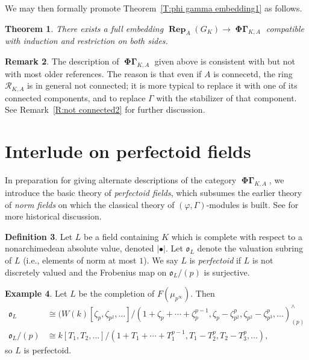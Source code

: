 \documentclass[12pt]{amsart}
\newtheorem{theorem}{Theorem}[section]
\theoremstyle{definition}
\newtheorem{defn}[theorem]{Definition}
\newtheorem{example}[theorem]{Example}
\newtheorem{remark}[theorem]{Remark}
\numberwithin{equation}{theorem}
\newcommand{\calR}{\mathcal{R}}
\newcommand{\frako}{\mathfrak{o}}
\DeclareMathOperator{\PhiGamma}{\mathbf{\Phi \Gamma}}
\DeclareMathOperator{\Rep}{\mathbf{Rep}}
\begin{document}
We may then formally promote Theorem~\ref{T:phi gamma embedding1} as follows.
\begin{theorem} \label{T:phi gamma embedding}
There exists a full embedding $\Rep_A(G_K) \to \PhiGamma_{K,A}$ compatible with induction and restriction on both sides.
\end{theorem}

\begin{remark} \label{R:not connected}
The description of $\PhiGamma_{K,A}$ given above is consistent with \cite{kedlaya-new-phigamma} but not with most older references. The reason is that even if $A$ is connecetd, the ring $\calR_{K,A}$ is in general not connected; it is more typical to replace it with one of its connected components, and to replace $\Gamma$ with the stabilizer of that component.
See Remark~\ref{R:not connected2} for further discussion.
\end{remark}

\section{Interlude on perfectoid fields}
\label{sec:perfectoid}

In preparation for giving alternate descriptions of the category $\PhiGamma_{K,A}$, we introduce the basic theory of \emph{perfectoid fields}, which subsumes the earlier theory of \emph{norm fields} on which the classical theory of $(\varphi, \Gamma)$-modules is built. See \cite{kedlaya-new-phigamma} for more historical discussion.

\begin{defn}
Let $L$ be a field containing $K$ which is complete with respect to a nonarchimedean absolute value, denoted $\left| \bullet \right|$. Let $\frako_L$ denote the valuation subring of $L$ (i.e., elements of norm at most $1$). We say $L$ is \emph{perfectoid} if $L$ is not discretely valued and the Frobenius map on $\frako_L/(p)$ is surjective.
\end{defn}

\begin{example}  \label{exa:cyclotomic}
Let $L$ be the completion of $F(\mu_{p^\infty})$.
Then 
\begin{align*}
\frako_L &\cong (W(k)[\zeta_p, \zeta_{p^2}, \dots]/(1 + \zeta_p + \cdots + \zeta_p^{p-1}, \zeta_p - \zeta_{p^2}^p, \zeta_{p^2} - \zeta_{p^3}^p, \dots)^{\wedge}_{(p)} \\
\frako_L/(p) &\cong k[T_1, T_2, \dots]/(1+T_1 + \cdots + T_1^{p-1}, T_1 - T_2^p, T_2 - T_3^p, \dots),
\end{align*}
so $L$ is perfectoid.
\end{example}
\end{document}
